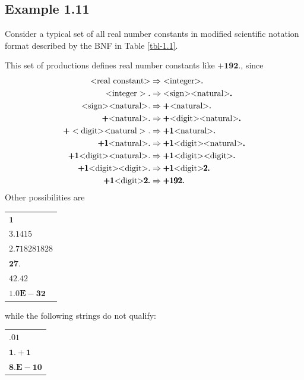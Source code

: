 \subsection*{Example 1.11}

Consider a typical set of all real number constants in modified scientific
notation format described by the BNF in Table \ref{tbl-1.1}.

This set of productions defines real number constants like $\pmb{+192.}$, since
\begin{align*}
\<\text{real constant}\> &\Rightarrow \<\text{integer}\>\pmb{.} \\
\<\text{integer}>. &\Rightarrow \<\text{sign}\>\<\text{natural}\>\pmb{.} \\
\<\text{sign}\>\<\text{natural}\>. &\Rightarrow \pmb{+} \<\text{natural}\>\pmb{.} \\
\pmb{+}\<\text{natural}\>. &\Rightarrow \pmb{+}\<\text{digit}\>\<\text{natural}\>\pmb{.} \\
\pmb{+}<\text{digit}\>\<\text{natural}>. &\Rightarrow \pmb{+1}\<\text{natural}\>\pmb{.} \\
\pmb{+1}\<\text{natural}\>. &\Rightarrow \pmb{+1}\<\text{digit}\>\<\text{natural}\>\pmb{.} \\
\pmb{+1}\<\text{digit}\>\<\text{natural}\>. &\Rightarrow\pmb{+1}\<\text{digit}\>\<\text{digit}\>\pmb{.} \\
\pmb{+1}\<\text{digit}\>\<\text{digit}\>. &\Rightarrow\pmb{+1}\<\text{digit}\>\pmb{2.} \\
\pmb{+1}\<\text{digit}\>\pmb{2.}&\Rightarrow \pmb{+192.}
\end{align*}
Other possibilities are
\begin{center}
\begin{tabular}{l}
$\pmb{1}$ \\
$\pmb{3.1415}$ \\
$\pmb{2.718281828}$ \\
$\pmb{27.}$ \\
$\pmb{42.42}$ \\
$\pmb{1.0E-32}$
\end{tabular}
\end{center}
while the following strings do not qualify:
\begin{center}
\begin{tabular}{l}
$\pmb{.01}$ \\
$\pmb{1.+1}$ \\
$\pmb{8.E-10}$
\end{tabular}
\end{center}

